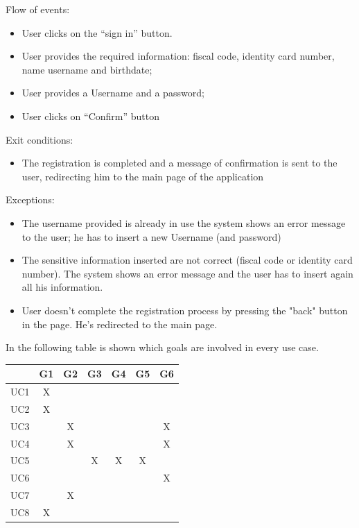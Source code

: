 \documentclass[a4paper]{report}
\begin{document}
Flow of events:
\begin{itemize}
\item User clicks on the “sign in” button.
\item User provides the required information: fiscal code, identity card number, name username and birthdate;
\item User provides a Username and a password;
\item User clicks on “Confirm” button
\end{itemize}
Exit conditions: 
\begin{itemize}
\item The registration is completed and a message of confirmation is sent to the user, redirecting him to the main page of the application
\end{itemize} 
Exceptions: 
\begin{itemize}
\item The username provided is already in use the system shows an error message to the user; he has to insert a new Username (and password)
\item The sensitive information inserted are not correct (fiscal code or identity card number). The system shows an error message and the user has to insert again all his information.
\item User doesn't complete the registration process by pressing the "back" button in the page. He's redirected to the main page.
\end{itemize}

In the following table is shown which goals are involved in every use case.
\begin{table}[H]  
  \centering
  \begin{tabular}{|c|c|c|c|c|c|c|}
    \cline{2-7}
    \multicolumn{1}{c|}{} & G1 & G2 & G3 & G4 & G5 & G6 \\ \hline
    UC1 & X &   &   &   &   &   \\ \hline
    UC2 & X &   &   &   &   &   \\ \hline
    UC3 &   & X &   &   &   & X \\ \hline
    UC4 &   & X &   &   &   & X \\ \hline
    UC5 &   &   & X & X & X &   \\ \hline
    UC6 &   &   &   &   &   & X \\ \hline
    UC7 &   & X &   &   &   &   \\ \hline
    UC8 & X &   &   &   &   &   \\ \hline
  \end{tabular}
\end{table}
\end{document}
